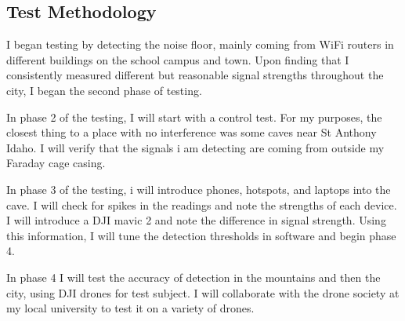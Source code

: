 \documentclass[12pt]{article}
\begin{document}
\subsection{Test Methodology}
\text I began testing by detecting the noise floor, mainly coming from WiFi routers in different buildings on the school campus and town. Upon finding that I consistently measured different but reasonable signal strengths throughout the city, I began the second phase of testing.

In phase 2 of the testing, I will start with a control test. For my purposes, the closest thing to a place with no interference was some caves near St Anthony Idaho. I will verify that the signals i am detecting are coming from outside my Faraday cage casing. 

In phase 3 of the testing, i will introduce phones, hotspots, and laptops into the cave. I will check for spikes in the readings and note the strengths of each device. I will introduce a DJI mavic 2 and note the difference in signal strength. Using this information, I will tune the detection thresholds in software and begin phase 4.

In phase 4 I will test the accuracy of detection in the mountains and then the city, using DJI drones for test subject. I will collaborate with the drone society at my local university to test it on a variety of drones. 
\end{document}
